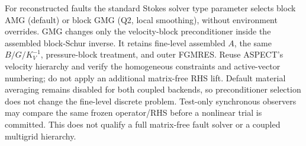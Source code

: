 \documentclass[11pt]{article}
\begin{document}
For reconstructed faults the standard Stokes solver type parameter selects
block AMG (default) or block GMG (Q2, local smoothing), without environment
overrides. GMG changes only the velocity-block preconditioner
inside the assembled block-Schur inverse. It retains fine-level assembled
$A$, the same $B/G/K_V^{-1}$, pressure-block treatment, and outer FGMRES.
Reuse ASPECT's velocity hierarchy and verify the homogeneous constraints and
active-vector numbering; do not apply an additional matrix-free RHS lift.
Default material averaging remains disabled for both coupled backends, so
preconditioner selection does not change the fine-level discrete problem.
Test-only synchronous observers may compare the same frozen operator/RHS
before a nonlinear trial is committed. This does not qualify a full
matrix-free fault solver or a coupled multigrid hierarchy.
\end{document}
